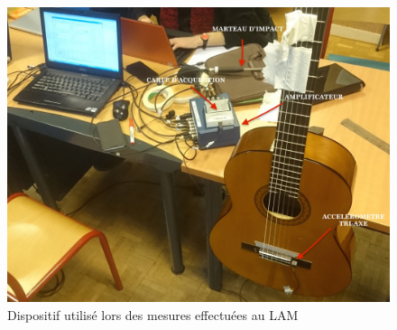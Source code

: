 \begin{figure}[hpbt]
\centering
   \includegraphics[scale=0.15]{figures/dispo.jpg}
\caption{Dispositif utilisé lors des mesures effectuées au LAM\label{fig:disp}}
\end{figure}